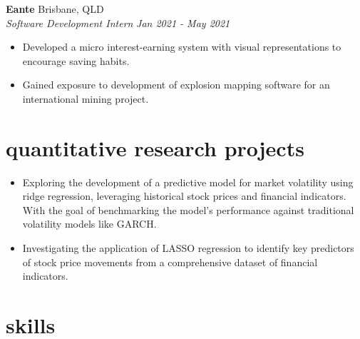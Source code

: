 \documentclass[12pt]{article}
\begin{document}
\textbf{Eante} \hfill {Brisbane, QLD} \\
\indent \textit{\color{subtextgray}Software Development Intern} \hfill \textit{\color{subtextgray}Jan 2021 - May 2021}
\begin{itemize}[noitemsep, topsep=0em, left=0.8em]
  \item Developed a micro interest-earning system with visual representations to encourage saving habits.
  \item	Gained exposure to development of explosion mapping software for an international mining project.
\end{itemize}

\vspace{1em}

\section{quantitative research projects}

\begin{itemize}[noitemsep, topsep=0em, left=0.8em]
  \item Exploring the development of a predictive model for market volatility using ridge regression, leveraging historical stock prices and financial indicators. With the goal of benchmarking the model's performance against traditional volatility models like GARCH.
  \item	Investigating the application of LASSO regression to identify key predictors of stock price movements from a comprehensive dataset of financial indicators.
\end{itemize}

\vspace{1em}

\section{skills}
\end{document}
